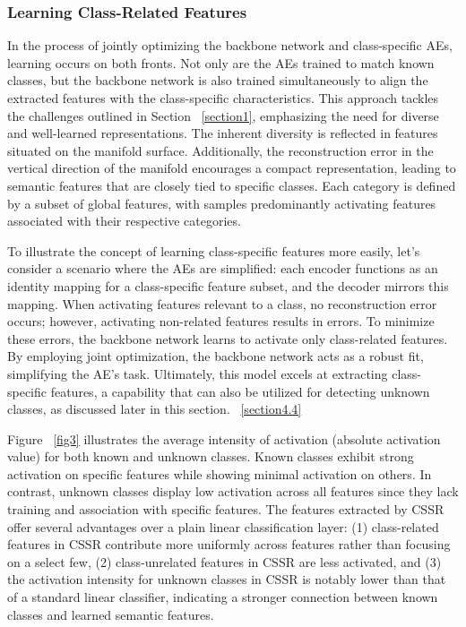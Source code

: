 \documentclass{gji}
\begin{document}
\subsubsection{Learning Class-Related Features}
In the process of jointly optimizing the backbone network and class-specific AEs, learning occurs on both fronts. Not only are the AEs trained to match known classes, but the backbone network is also trained simultaneously to align the extracted features with the class-specific characteristics. This approach tackles the challenges outlined in Section ~\ref{section1}, emphasizing the need for diverse and well-learned representations. The inherent diversity is reflected in features situated on the manifold surface. Additionally, the reconstruction error in the vertical direction of the manifold encourages a compact representation, leading to semantic features that are closely tied to specific classes. Each category is defined by a subset of global features, with samples predominantly activating features associated with their respective categories.

To illustrate the concept of learning class-specific features more easily, let's consider a scenario where the AEs are simplified: each encoder functions as an identity mapping for a class-specific feature subset, and the decoder mirrors this mapping. When activating features relevant to a class, no reconstruction error occurs; however, activating non-related features results in errors. To minimize these errors, the backbone network learns to activate only class-related features. By employing joint optimization, the backbone network acts as a robust fit, simplifying the AE's task. Ultimately, this model excels at extracting class-specific features, a capability that can also be utilized for detecting unknown classes, as discussed later in this section. ~\ref{section4.4}

Figure ~\ref{fig3} illustrates the average intensity of activation (absolute activation value) for both known and unknown classes. Known classes exhibit strong activation on specific features while showing minimal activation on others. In contrast, unknown classes display low activation across all features since they lack training and association with specific features. The features extracted by CSSR offer several advantages over a plain linear classification layer: (1) class-related features in CSSR contribute more uniformly across features rather than focusing on a select few, (2) class-unrelated features in CSSR are less activated, and (3) the activation intensity for unknown classes in CSSR is notably lower than that of a standard linear classifier, indicating a stronger connection between known classes and learned semantic features.
\end{document}
